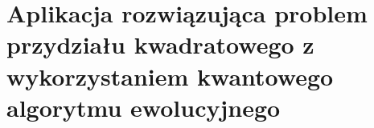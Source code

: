 \chapter{Aplikacja rozwiązująca problem przydziału kwadratowego z wykorzystaniem kwantowego algorytmu ewolucyjnego}
\label{cha:aplikacja}